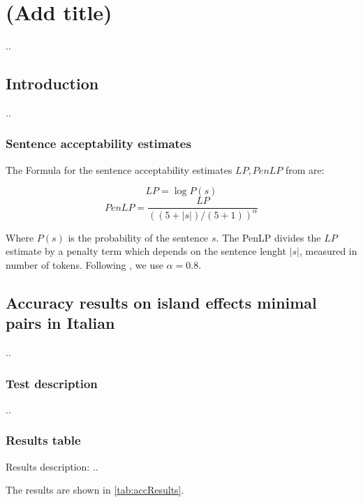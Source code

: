 \chapter{(Add title)}

..

\section{Introduction}
..
\subsection{Sentence acceptability estimates}

The Formula for the sentence acceptability estimates \( LP, PenLP \) from \citet{lau2020furiously} are:

\begin{displaymath}
	LP = \log P(s)
\end{displaymath}
\begin{displaymath}
	PenLP = \frac{LP}{((5+|s|) \big/ (5+1))^\alpha}
\end{displaymath}

Where \( P(s) \) is the probability of the sentence \( s \). The PenLP divides the \( LP \) estimate by a penalty term which depends on the sentence lenght \( |s| \), measured in number of tokens. Following \citet{lau2020furiously}, we use \( \alpha=0.8 \).


\section{Accuracy results on island effects minimal pairs in Italian}

..

\subsection{Test description}

..

\subsection{Results table}

Results description: ..

The results are shown in \autoref{tab:accResults}.

